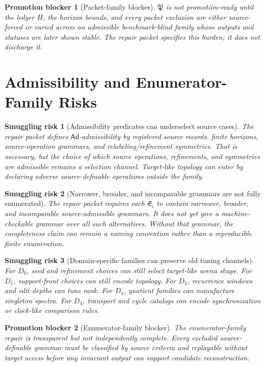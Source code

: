 \documentclass[11pt]{article}
\newcommand{\PackFam}{\mathfrak{P}}
\newcommand{\EnumFam}{\mathfrak{E}}
\newcommand{\Ad}{\mathsf{Ad}}
\newtheorem{smugglingrisk}{Smuggling risk}
\newtheorem{promotionblocker}{Promotion blocker}
\begin{document}
\begin{promotionblocker}[Packet-family blocker]
\(\PackFam\) is not promotion-ready until the ledger \(H\), the horizon
bounds, and every packet exclusion are either source-forced or varied across
an admissible benchmark-blind family whose outputs and statuses are later
shown stable. The repair packet specifies this burden; it does not discharge
it.
\end{promotionblocker}

\section{Admissibility and Enumerator-Family Risks}

\begin{smugglingrisk}[Admissibility predicates can underselect source cases]
The repair packet defines \(\Ad\)-admissibility by registered source records,
finite horizons, source-operation grammars, and relabeling/refinement
symmetries. That is necessary, but the choice of which source operations,
refinements, and symmetries are admissible remains a selection channel.
Target-like topology can enter by declaring adverse source-definable
operations outside the family.
\end{smugglingrisk}

\begin{smugglingrisk}[Narrower, broader, and incomparable grammars are not fully enumerated]
The repair packet requires each \(\EnumFam_i\) to contain narrower, broader,
and incomparable source-admissible grammars. It does not yet give a
machine-checkable grammar over all such alternatives. Without that grammar,
the completeness claim can remain a naming convention rather than a
reproducible finite enumeration.
\end{smugglingrisk}

\begin{smugglingrisk}[Domain-specific families can preserve old tuning channels]
For \(D_0\), seed and refinement choices can still select target-like arena
shape. For \(D_1\), support-front choices can still encode topology. For
\(D_2\), recurrence windows and edit depths can tune rank. For \(D_3\),
quotient families can manufacture singleton spectra. For \(D_4\), transport
and cycle catalogs can encode synchronization or clock-like comparison rules.
\end{smugglingrisk}

\begin{promotionblocker}[Enumerator-family blocker]
The enumerator-family repair is transparent but not independently complete.
Every excluded source-definable grammar must be classified by source criteria
and replayable without target access before any invariant output can support
candidate reconstruction.
\end{promotionblocker}
\end{document}
